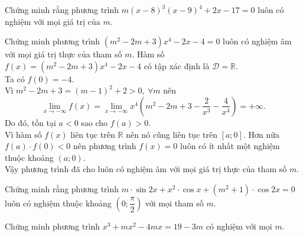 \begin{bt}%
	Chứng minh rằng phương trình $m(x-8)^3(x-9)^4+2x-17=0$ luôn có nghiệm với mọi giá trị của $m$.
\end{bt}
\begin{bt}%
	Chứng minh phương trình $\left(m^2-2m+3\right)x^4-2x-4=0$ luôn có nghiệm âm với mọi giá trị thực của tham số $m$.
	\loigiai
	{Hàm số $f(x)=\left(m^2-2m+3\right)x^4-2x-4$ có tập xác định là $\mathscr{D}=\mathbb{R}$.\\
		Ta có $f(0)=-4$.\\
		Vì $m^2-2m+3=(m-1)^2+2>0,\ \forall m$ nên $$\lim\limits_{x\to -\infty} f(x)=\lim\limits_{x\to -\infty} x^4\left(m^2-2m+3-\dfrac{2}{x^3}-\dfrac{4}{x^4}\right)=+\infty.$$
		Do đó, tồn tại $a<0$ sao cho $f(a)>0$.\\
		Vì hàm số $f(x)$ liên tục trên $\mathbb{R}$ nên nó cũng liên tục trên $[a; 0]$. Hơn nữa $f(a)\cdot f(0)<0$ nên phương trình $f(x)=0$ luôn có ít nhất một nghiệm thuộc khoảng $(a; 0)$.\\
		Vậy phương trình đã cho luôn có nghiệm âm với mọi giá trị thực của tham số $m$.
	}
\end{bt}
\begin{bt}%
	Chứng minh rằng phương trình $m\cdot\sin 2x+x^2\cdot\cos x+\left(m^2+1\right)\cdot\cos 2x=0$ luôn có nghiệm thuộc khoảng $\left(0 ;\dfrac{\pi}{2}\right)$ với mọi tham số $m$.
\end{bt}
\begin{bt}%
	Chứng minh phương trình $x^3+m x^2-4m x=19-3m$ có nghiệm với mọi $m$.
\end{bt}
